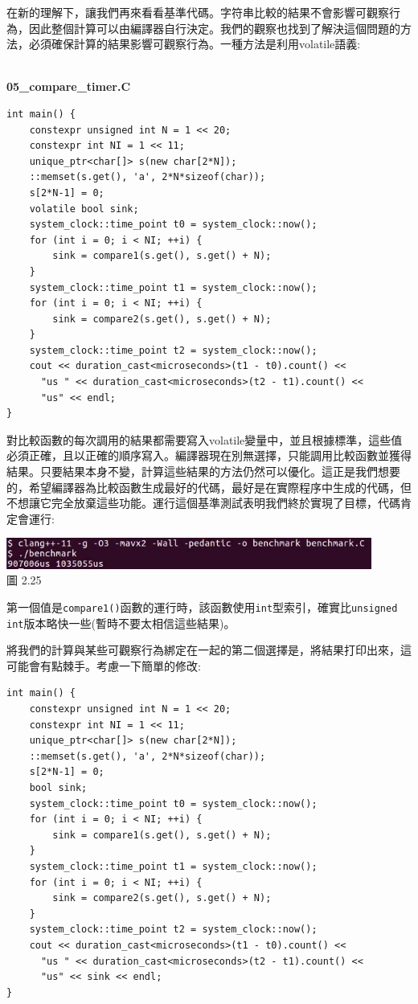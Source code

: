 在新的理解下，讓我們再來看看基準代碼。字符串比較的結果不會影響可觀察行為，因此整個計算可以由編譯器自行決定。我們的觀察也找到了解決這個問題的方法，必須確保計算的結果影響可觀察行為。一種方法是利用volatile語義:

\hspace*{\fill} \\ %
\noindent
\textbf{05\_compare\_timer.C}
\begin{lstlisting}[style=styleCXX]
int main() {
	constexpr unsigned int N = 1 << 20;
	constexpr int NI = 1 << 11;
	unique_ptr<char[]> s(new char[2*N]);
	::memset(s.get(), 'a', 2*N*sizeof(char));
	s[2*N-1] = 0;
	volatile bool sink;
	system_clock::time_point t0 = system_clock::now();
	for (int i = 0; i < NI; ++i) {
		sink = compare1(s.get(), s.get() + N);
	}
	system_clock::time_point t1 = system_clock::now();
	for (int i = 0; i < NI; ++i) {
		sink = compare2(s.get(), s.get() + N);
	}
	system_clock::time_point t2 = system_clock::now();
	cout << duration_cast<microseconds>(t1 - t0).count() <<
	  "us " << duration_cast<microseconds>(t2 - t1).count() <<
	  "us" << endl;
}
\end{lstlisting}

對比較函數的每次調用的結果都需要寫入volatile變量中，並且根據標準，這些值必須正確，且以正確的順序寫入。編譯器現在別無選擇，只能調用比較函數並獲得結果。只要結果本身不變，計算這些結果的方法仍然可以優化。這正是我們想要的，希望編譯器為比較函數生成最好的代碼，最好是在實際程序中生成的代碼，但不想讓它完全放棄這些功能。運行這個基準測試表明我們終於實現了目標，代碼肯定會運行:

\begin{center}
\includegraphics[width=0.9\textwidth]{content/1/chapter2/images/25.jpg}\\
圖 2.25
\end{center}

第一個值是\texttt{compare1()}函數的運行時，該函數使用\texttt{int}型索引，確實比\texttt{unsigned int}版本略快一些(暫時不要太相信這些結果)。

將我們的計算與某些可觀察行為綁定在一起的第二個選擇是，將結果打印出來，這可能會有點棘手。考慮一下簡單的修改:

\begin{lstlisting}[style=styleCXX]
int main() {
	constexpr unsigned int N = 1 << 20;
	constexpr int NI = 1 << 11;
	unique_ptr<char[]> s(new char[2*N]);
	::memset(s.get(), 'a', 2*N*sizeof(char));
	s[2*N-1] = 0;
	bool sink;
	system_clock::time_point t0 = system_clock::now();
	for (int i = 0; i < NI; ++i) {
		sink = compare1(s.get(), s.get() + N);
	}
	system_clock::time_point t1 = system_clock::now();
	for (int i = 0; i < NI; ++i) {
		sink = compare2(s.get(), s.get() + N);
	}
	system_clock::time_point t2 = system_clock::now();
	cout << duration_cast<microseconds>(t1 - t0).count() <<
	  "us " << duration_cast<microseconds>(t2 - t1).count() <<
	  "us" << sink << endl;
}
\end{lstlisting}

